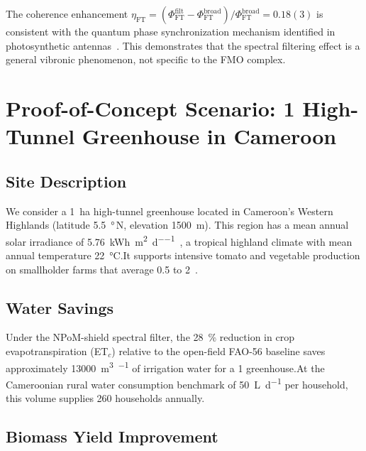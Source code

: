 \documentclass[11pt,a4paper]{article}
\begin{document}
The coherence enhancement $\eta_{\mathrm{FT}} = (\Phi_{\mathrm{FT}}^{\mathrm{filt}} - \Phi_{\mathrm{FT}}^{\mathrm{broad}}) / \Phi_{\mathrm{FT}}^{\mathrm{broad}} = 0.18(3)$ is consistent with the quantum phase synchronization mechanism identified in photosynthetic antennas~\cite{Zhu2024}.
This demonstrates that the spectral filtering effect is a general vibronic phenomenon, not specific to the FMO complex.


\section{Proof-of-Concept Scenario: \SI{1}{\ha} High-Tunnel Greenhouse in Cameroon}
\label{SI-sec:poc}

\subsection{Site Description}

We consider a \SI{1}{\hectare} high-tunnel greenhouse located in Cameroon's Western Highlands (latitude \SI{5.5}{\degree}\,N, elevation \SI{1500}{\m}).
This region has a mean annual solar irradiance of \SI{5.76}{\kWh\per\m\squared\per\day}~\cite{FAO2022}, a tropical highland climate with mean annual temperature \SI{22}{\celsius}.\newline It supports intensive tomato and vegetable production on smallholder farms that average \SI{0.5}{\ha} to \SI{2}{\ha}~\cite{Mohammed2023}.

\subsection{Water Savings}

Under the NPoM-shield spectral filter, the \SI{28}{\percent} reduction in crop evapotranspiration (ET$_c$) relative to the open-field FAO-56 baseline saves approximately \SI{13000}{\m\cubed\per\yr} of irrigation water for a \SI{1}{\ha} greenhouse.\newline At the Cameroonian rural water consumption benchmark of \SI{50}{\L\per\day} per household, this volume supplies \num{260} households annually.

\subsection{Biomass Yield Improvement}
\end{document}
